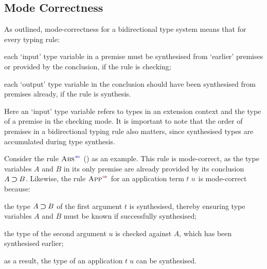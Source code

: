 \subsection{Mode Correctness}\label{sec:mode-correctness}
As \citet{Dunfield2021} outlined, mode-correctness for a bidirectional type system means that for every typing rule:
\begin{enumerate*}
\item each `input' type variable in a premise must be synthesised from `earlier' premises or provided by the conclusion, if the rule is checking;
\item each `output' type variable in the conclusion should have been synthesised from premises already, if the rule is synthesis.
\end{enumerate*}
Here an `input' type variable refers to types in an extension context and the type of a premise in the checking mode.
It is important to note that the order of premises in a bidirectional typing rule also matters, since synthesised types are accumulated during type synthesis.

Consider the rule $\ChkRule{Abs}$ () as an example.
This rule is mode-correct, as the type variables $A$ and $B$ in its only premise are already provided by its conclusion $A \mathbin{\bm{\supset}} B$.
Likewise, the rule $\SynRule{App}$ for an application term $\isTerm{t\;u}$ is mode-correct because:
\begin{enumerate*}
\item the type $A \mathbin{\bm{\supset}} B$ of the first argument $t$ is synthesised, thereby ensuring type variables $A$ and $B$ must be known if successfully synthesised;
\item the type of the second argument $u$ is checked against $A$, which has been synthesised earlier;
\item as a result, the type of an application $t\;u$ can be synthesised.
\end{enumerate*}




